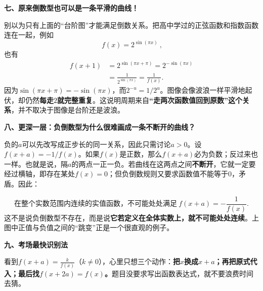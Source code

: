 \clearpage
\begin{explanationbox}
\textbf{\textcolor{CExplanation}{七、原来倒数型也可以是一条平滑的曲线！}}



别以为只有上面的“台阶图”才能满足倒数关系。把高中学过的正弦函数和指数函数连在一起，例如
\[
\boxed{\ f(x)=2^{\sin(\pi x)}\ },
\]
也有
\[
\begin{aligned}
 f(x+1)&=2^{\sin(\pi x+\pi)}
 =2^{-\sin(\pi x)}\\
 &=\frac1{2^{\sin(\pi x)}}=\frac1{f(x)}.
\end{aligned}
\]
因为$\sin(\pi x+\pi)=-\sin(\pi x)$，而\(2^{-u}=1/2^u\)。图像会像波浪一样平滑地起伏，却仍然\textbf{每走$2$就完整重复}。这说明周期来自\textbf{“走两次函数值回到原数”这个关系}，并不取决于图像是台阶还是波浪。


\medskip

\end{explanationbox}
\clearpage
\begin{explanationbox}
\textbf{\textcolor{CExplanation}{八、更深一层：负倒数型为什么很难画成一条不断开的曲线？}}



负的$a$可以先改写成正步长的同一关系，因此只需讨论$a>0$。设$f(x+a)=-1/f(x)$。如果$f(x)$是正数，那么$f(x+a)$必为负数；反过来也一样。也就是说，隔$a$的两点一正一负。若曲线在这两点之间\textbf{不断开}，它就一定要经过横轴，即存在某处$f(x)=0$；但负倒数规则又要求函数值不能等于$0$，矛盾。因此：

\[
\boxed{\text{在整个实数范围内连续的实值函数，不可能处处满足}
\ f(x+a)=-\frac1{f(x)}.}
\]
这不是说负倒数型不存在，而是说\textbf{它若定义在全体实数上，就不可能处处连续}。上图中正值与负值之间的“跳变”正是一个很直观的例子。

\medskip

\end{explanationbox}
\clearpage
\begin{explanationbox}
\textbf{\textcolor{CExplanation}{九、考场最快识别法}}



看到\(f(x+a)=\frac{k}{f(x)}\)（$k\ne0$），心里只想三个动作：\textbf{把$x$换成$x+a$；再把原式代入；最后找$f(x+2a)=f(x)$。}题目没要求写出函数表达式，就不要浪费时间去猜。
\end{explanationbox}
